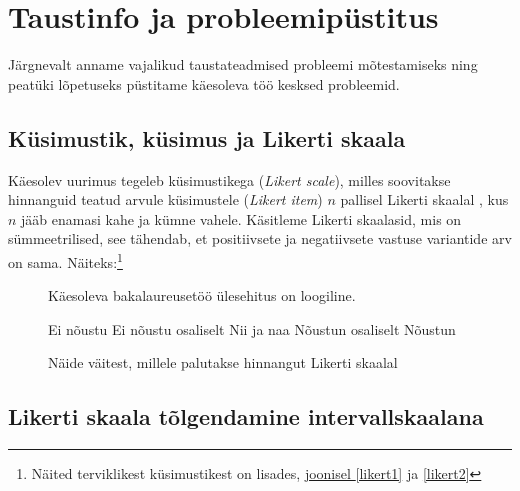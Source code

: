 \documentclass[a4paper,12pt]{article}
\numberwithin{equation}{section}
\theoremstyle{definition}
\begin{document}
\section{Taustinfo ja probleemipüstitus}

Järgnevalt anname vajalikud taustateadmised probleemi mõtestamiseks ning peatüki lõpetuseks püstitame käesoleva töö kesksed probleemid.

\subsection{Küsimustik, küsimus ja Likerti skaala}

Käesolev uurimus tegeleb k\"usimustikega (\textit{Likert scale}), milles soovitakse hinnanguid teatud arvule küsimustele (\textit{Likert item}) $n$ pallisel Likerti skaalal \cite{Edmondson}, kus $n$ jääb enamasi kahe ja kümne vahele. Käsitleme Likerti skaalasid, mis on sümmeetrilised, see tähendab, et positiivsete ja negatiivsete vastuse variantide arv on sama. Näiteks:\footnote{Näited terviklikest k\"usimustikest on lisades, \hyperref[likert1]{joonisel \ref*{likert1}} ja \hyperref[likert2]{ \ref*{likert2}}}

\vspace{10pt}

\begin{figure}[H]


\colorbox{background_example}{\parbox{\textwidth}{

\vspace{1mm}

Käesoleva bakalaureusetöö \"ulesehitus on loogiline.

\vspace{5pt}

\begin{Form}
\def\DefaultWidthofChoiceMenu{12pt}%


\small{
	\CheckBox[bordercolor = gray,name=optionE]{\mbox{}} Ei nõustu 
	\CheckBox[bordercolor = gray,name=optionD]{\mbox{}} Ei nõustu osaliselt
	\CheckBox[bordercolor = gray,name=optionC]{\mbox{}} Nii ja naa
	\CheckBox[bordercolor = gray,name=optionC]{\mbox{}}  Nõustun osaliselt
	\CheckBox[checked,bordercolor = gray,name=optionC]{\mbox{}} Nõustun
}


\end{Form}}}
\caption{Näide väitest, millele palutakse hinnangut Likerti skaalal}
\label{likert_question}
\end{figure}

\subsection{Likerti skaala tõlgendamine intervallskaalana}
\end{document}
